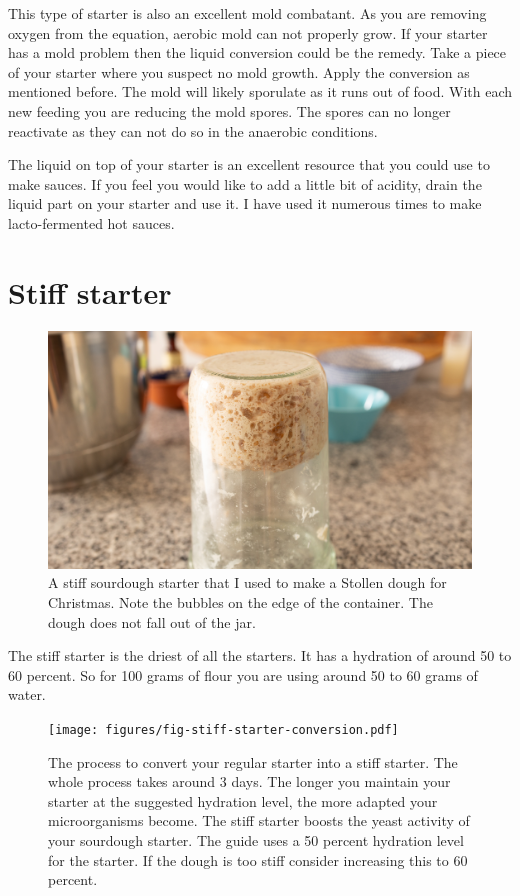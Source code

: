 This type of starter is also an excellent mold combatant. As you are removing
oxygen from the equation, aerobic mold can not properly grow. If your starter
has a mold problem then the liquid conversion could be the remedy. Take a
piece of your starter where you suspect no mold growth. Apply the conversion
as mentioned before. The mold will likely sporulate as it runs out of food.
With each new feeding you are reducing the mold spores. The spores can no
longer reactivate as they can not do so in the anaerobic conditions.

The liquid on top of your starter is an excellent resource that you could use
to make sauces. If you feel you would like to add a little bit of acidity,
drain the liquid part on your starter and use it. I have used it numerous
times to make lacto-fermented hot sauces.

\section{Stiff starter}
\label{section:stiff-starter}

\begin{figure}[!htb]
  \includegraphics[width=\textwidth]{sourdough-starter-stiff.jpg}
  \caption{A stiff sourdough starter that I used to make a Stollen dough for Christmas. Note
  the bubbles on the edge of the container. The dough does not fall out of the jar.}
  \label{fig:stiff-sourdough-starter}
\end{figure}

The stiff starter is the driest of all the starters. It has a hydration of
around 50 to 60 percent. So for 100 grams of flour you are using around 50 to
60 grams of water.

\begin{figure}[!htb]
  \texttt{[image: figures/fig-stiff-starter-conversion.pdf]}
  \caption{The process to convert your regular starter into a stiff starter. The whole
  process takes around 3 days. The longer you maintain your starter at the
  suggested hydration level, the more adapted your microorganisms become. The
  stiff starter boosts the yeast activity of your sourdough starter.
  The guide uses a 50 percent hydration level for the starter. If the dough is too stiff
  consider increasing this to 60 percent.}
  \label{fig:stiff-starter-conversion}
\end{figure}

